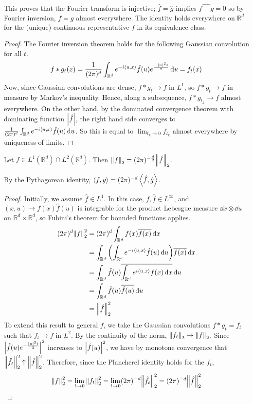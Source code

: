 \begin{remark}
	This proves that the Fourier transform is injective; \( \hat f = \hat g \) implies \( \widehat{f - g} = 0 \) so by Fourier inversion, \( f = g \) almost everywhere.
	The identity holds everywhere on \( \mathbb R^d \) for the (unique) continuous representative \( f \) in its equivalence class.
\end{remark}
\begin{proof}
	The Fourier inversion theorem holds for the following Gaussian convolution for all \( t \).
	\[ f \ast g_t(x) = \frac{1}{(2\pi)^d} \int_{\mathbb R^d} e^{-i\left\langle{u,x}\right\rangle} \hat f(u) e^{\frac{-\abs{u}^2 t}{2}} \dd{u} = f_t(x) \]
	Now, since Gaussian convolutions are dense, \( f \ast g_t \to f \) in \( L^1 \), so \( f \ast g_t \to f \) in measure by Markov's inequality.
	Hence, along a subsequence, \( f \ast g_{t_k} \to f \) almost everywhere.
	On the other hand, by the dominated convergence theorem with dominating function \( \abs{\hat f} \), the right hand side converges to \( \frac{1}{(2\pi)^d} \int_{\mathbb R^d} e^{-i\left\langle{u,x}\right\rangle} \hat f(u) \dd{u} \).
	So this is equal to \( \lim_{t_k \to 0} f_{t_k} \) almost everywhere by uniqueness of limits.
\end{proof}
\begin{theorem}[Plancherel]
	Let \( f \in L^1(\mathbb R^d) \cap L^2(\mathbb R^d) \).
	Then \( \norm{f}_2 = (2\pi)^{-\frac{d}{2}} \norm{\hat f}_2 \).
\end{theorem}
\begin{remark}
	By the Pythagorean identity, \( \left\langle{f, g}\right\rangle = (2\pi)^{-d} \left\langle{\hat f, \hat g}\right\rangle \).
\end{remark}
\begin{proof}
	Initially, we assume \( \hat f \in L^1 \).
	In this case, \( f, \hat f \in L^\infty \), and \( (x,u) \mapsto f(x)\hat f(u) \) is integrable for the product Lebesgue measure \( \dd{x} \otimes \dd{u} \) on \( \mathbb R^d \times \mathbb R^d \), so Fubini's theorem for bounded functions applies.
	\begin{align*}
		(2\pi)^d \norm{f}_2^2 &= (2\pi)^d \int_{\mathbb R^d} f(x) \overline{f(x)} \dd{x} \\
		&= \int_{\mathbb R^d} \qty(\int_{\mathbb R^d} e^{-i\left\langle{u,x}\right\rangle} \hat f(u) \dd{u}) \overline{f(x)} \dd{x} \\
		&= \int_{\mathbb R^d} \hat f(u) \overline{\int_{\mathbb R^d} e^{i\left\langle{u,x}\right\rangle} f(x) \dd{x}} \dd{u} \\
		&= \int_{\mathbb R^d} \hat f(u) \overline{\hat f(u)} \dd{u} \\
		&= \norm{\hat f}_2^2
	\end{align*}
	To extend this result to general \( f \), we take the Gaussian convolutions \( f \ast g_t = f_t \) such that \( f_t \to f \) in \( L^2 \).
	By the continuity of the norm, \( \norm{f_t}_2 \to \norm{f}_2 \).
	Since \( \abs{\hat f(u) e^{-\frac{\abs{u}^2 t}{2}}}^2 \) increases to \( \abs{\hat f(u)}^2 \), we have by monotone convergence that \( \norm{\hat f_t}_2^2 \uparrow \norm{\hat f}_2^2 \).
	Therefore, since the Plancherel identity holds for the \( f_t \),
	\[ \norm{f}_2^2 = \lim_{t \to 0} \norm{f_t}_2^2 = \lim_{t \to 0} (2\pi)^{-d} \norm{\hat f_t}_2^2 = (2\pi)^{-d} \norm{\hat f}_2^2 \]
\end{proof}
